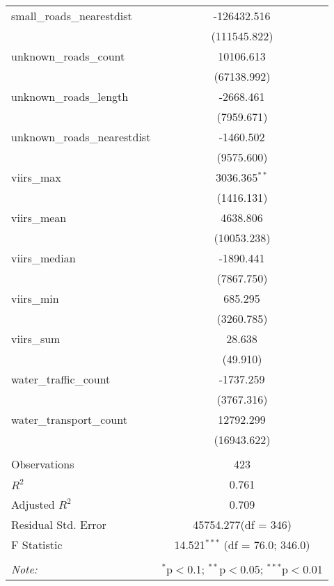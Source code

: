 \begin{table}[!htbp]
\begin{tabular}{@{\extracolsep{5pt}}lc}
 small_roads_nearestdist & -126432.516$^{}$ \\
  & (111545.822) \\
 unknown_roads_count & 10106.613$^{}$ \\
  & (67138.992) \\
 unknown_roads_length & -2668.461$^{}$ \\
  & (7959.671) \\
 unknown_roads_nearestdist & -1460.502$^{}$ \\
  & (9575.600) \\
 viirs_max & 3036.365$^{**}$ \\
  & (1416.131) \\
 viirs_mean & 4638.806$^{}$ \\
  & (10053.238) \\
 viirs_median & -1890.441$^{}$ \\
  & (7867.750) \\
 viirs_min & 685.295$^{}$ \\
  & (3260.785) \\
 viirs_sum & 28.638$^{}$ \\
  & (49.910) \\
 water_traffic_count & -1737.259$^{}$ \\
  & (3767.316) \\
 water_transport_count & 12792.299$^{}$ \\
  & (16943.622) \\
\hline \\[-1.8ex]
 Observations & 423 \\
 $R^2$ & 0.761 \\
 Adjusted $R^2$ & 0.709 \\
 Residual Std. Error & 45754.277(df = 346)  \\
 F Statistic & 14.521$^{***}$ (df = 76.0; 346.0) \\
\hline
\hline \\[-1.8ex]
\textit{Note:} & \multicolumn{1}{r}{$^{*}$p$<$0.1; $^{**}$p$<$0.05; $^{***}$p$<$0.01} \\
\end{tabular}
\end{table}